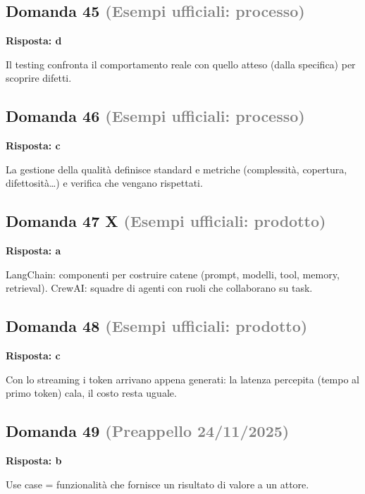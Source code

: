 \documentclass[a4paper,11pt]{article}
\begin{document}
\subsection*{Domanda 45 \hfill {\small \textcolor{gray}{(Esempi ufficiali: processo)}}}
\textbf{Risposta: d}\par
Il testing confronta il comportamento reale con quello atteso (dalla specifica) per scoprire difetti.



\subsection*{Domanda 46 \hfill {\small \textcolor{gray}{(Esempi ufficiali: processo)}}}
\textbf{Risposta: c}\par
La gestione della qualità definisce standard e metriche (complessità, copertura, difettosità…) e verifica che vengano rispettati.



\subsection*{Domanda 47 X \hfill {\small \textcolor{gray}{(Esempi ufficiali: prodotto)}}}
\textbf{Risposta: a}\par
LangChain: componenti per costruire catene (prompt, modelli, tool, memory, retrieval). CrewAI: squadre di agenti con ruoli che collaborano su task.



\subsection*{Domanda 48 \hfill {\small \textcolor{gray}{(Esempi ufficiali: prodotto)}}}
\textbf{Risposta: c}\par
Con lo streaming i token arrivano appena generati: la latenza percepita (tempo al primo token) cala, il costo resta uguale.



\subsection*{Domanda 49 \hfill {\small \textcolor{gray}{(Preappello 24/11/2025)}}}
\textbf{Risposta: b}\par
Use case = funzionalità che fornisce un risultato di valore a un attore.
\end{document}
